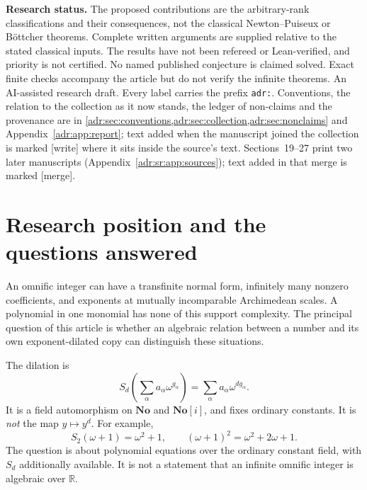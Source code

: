 \documentclass[11pt,letterpaper]{article}
\numberwithin{equation}{section}
\theoremstyle{definition}
\theoremstyle{remark}
\newcommand{\No}{\mathbf{No}}
\newcommand{\SC}{\mathbf{No}[i]}
\newcommand{\R}{\mathbb R}
\newcommand{\wtag}{\textup{[write]}}%
\newcommand{\mtag}{\textup{[merge]}}%
\begin{document}
\begin{titlepage}
\begin{abstract}
\mtag{} Two later manuscripts (Sections~19--27) prove that support rank at
least $m$ forces any $m$ distinct positive dilates to be algebraically
independent, so that the autonomous order of a finite-support omnific integer
is its rational support rank, in every rank.
\end{abstract}
\vfill
\begin{tcolorbox}
\small\textbf{Research status.} The proposed contributions are the
arbitrary-rank classifications and their consequences, not the classical
Newton--Puiseux or B\"ottcher theorems. Complete written arguments are supplied
relative to the stated classical inputs. The results have not been refereed
or Lean-verified, and priority is not certified. No named published conjecture
is claimed solved. Exact finite checks accompany the article but do not
verify the infinite theorems. An AI-assisted research draft. Every label
carries the prefix \texttt{adr:}. Conventions, the relation to the
collection as it now stands, the ledger of non-claims and the provenance
are in \cref{adr:sec:conventions,adr:sec:collection,adr:sec:nonclaims} and
Appendix~\ref{adr:app:report}; text added when the manuscript joined the collection
is marked \wtag{} where it sits inside the source's text. Sections~19--27
print two later manuscripts (Appendix~\ref{adr:sr:app:sources}); text added
in that merge is marked \mtag.
\end{tcolorbox}
\end{titlepage}
\hypersetup{pageanchor=true}
\tableofcontents
\clearpage
{}

\section{Research position and the questions answered}\label{adr:sec:position}

An omnific integer can have a transfinite normal form, infinitely many
nonzero coefficients, and exponents at mutually incomparable Archimedean
scales. A polynomial in one monomial has none of this support complexity.
The principal question of this article is whether an algebraic relation
between a number and its own exponent-dilated copy can distinguish these
situations.

The dilation is
\begin{equation}\label{adr:eq:dilationintro}
 S_d\!\left(\sum_\alpha a_\alpha\omega^{g_\alpha}\right)
   =\sum_\alpha a_\alpha\omega^{d g_\alpha}.
\end{equation}
It is a field automorphism on $\No$ and $\SC$, and fixes ordinary constants.
It is \emph{not} the map $y\mapsto y^d$. For example,
\[
 S_2(\omega+1)=\omega^2+1,
 \qquad (\omega+1)^2=\omega^2+2\omega+1.
\]
The question is about polynomial equations over the ordinary constant
field, with $S_d$ additionally available. It is not a statement that an
infinite omnific integer is algebraic over $\R$.
\end{document}
